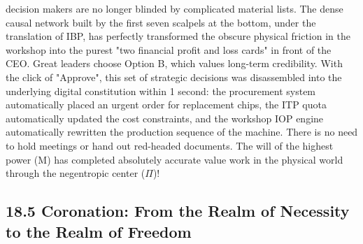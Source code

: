 \documentclass[11pt,a4paper]{article}
\begin{document}
decision makers are no longer blinded by complicated material lists. The dense causal network built by the first seven scalpels at the bottom, under the translation of IBP, has perfectly transformed the obscure physical friction in the workshop into the purest "two financial profit and loss cards" in front of the CEO. Great leaders choose Option B, which values long-term credibility. With the click of "Approve", this set of strategic decisions was disassembled into the underlying digital constitution within 1 second: the procurement system automatically placed an urgent order for replacement chips, the ITP quota automatically updated the cost constraints, and the workshop IOP engine automatically rewritten the production sequence of the machine. There is no need to hold meetings or hand out red-headed documents. The will of the highest power (M) has completed absolutely accurate value work in the physical world through the negentropic center ($\Pi$)!


\subsection*{18.5 Coronation: From the Realm of Necessity to the Realm of Freedom}
\end{document}
